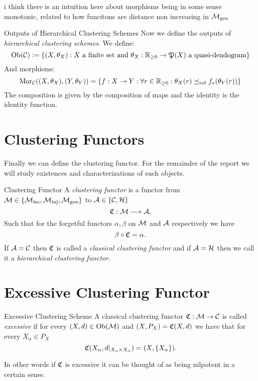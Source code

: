 \todo i think there is an intuition here about morphisms being in some sense monotonic, related to how funcitons are distance non increasing in ${\mathcal{M}_\mathrm{gen}}$

\begin{definition}{Outputs of Hierarchical Clustering Schemes}{}
Now we define the outputs of \emph{hierarchical clustering schemes}. We define:
\begin{equation*}
    \mathrm {Ob}(\mathcal{C}) := \{(X, \theta_X): X \text{ a finite set and } \theta_X: \mathbb R_{\geq0} \to \mathfrak{P}(X) \text{ a quasi-dendogram}\}
\end{equation*}
And morphisms:
\begin{equation*}
    \mathrm {Mor}_{\mathcal{C}}((X, \theta_X), (Y,\theta_Y)) = \{f: X \to Y: \forall r \in \mathbb R_{\geq0}: \theta_X(r) \preceq_\mathrm{ref} f_*(\theta_Y(r)) \}
\end{equation*}
The composition is given by the composition of maps and the identity is the identity function.
\end{definition}

\section{Clustering Functors}
Finally we can define the clustering functor. For the remainder of the report we will study existences and characterizations of such objects.
\begin{definition}{Clustering Functor}{}
A \emph{clustering functor} is a functor from $\mathcal{M} \in \{{\mathcal{M}_\mathrm{iso}}, {\mathcal{M}_\mathrm{inj}}, {\mathcal{M}_\mathrm{gen}}\}$ to $\mathcal{A} \in \{\mathcal{C}, \mathcal{H}\}$
$$\mathfrak{C} : \mathcal{M} \longrightarrow \mathcal{A}.$$
Such that for the forgetful functors $\alpha, \beta$ on $\mathcal{M}$ and $\mathcal{A}$ respectively we have
\begin{equation*}
    \beta \circ \mathfrak{C} = \alpha.
\end{equation*}
If $\mathcal{A} = \mathcal{C}$ then $\mathfrak{C}$ is called a \emph{classical clustering functor} and if $\mathcal{A} = \mathcal{H}$ then we call it a \emph{hierarchical clustering functor}.
\end{definition}



\section{Excessive Clustering Functor}
\begin{definition}{Excessive Clustering Scheme}{}
A classical clustering functor $\mathfrak{C}: \mathcal{M} \to \mathcal{C}$ is called \emph{excessive} if for every $(X,d) \in \mathrm {Ob}(\mathcal{M})$ and $(X,P_X) = \mathfrak{C}(X,d)$ we have that for every $X_\alpha \in P_X$
\begin{equation*}
    \mathfrak{C}(X_\alpha, d|_{X_\alpha \times X_\alpha}) = (X,\{X_\alpha\}).
\end{equation*}
\end{definition}
In other words if $\mathfrak{C}$ is excessive it can be thought of as being nilpotent in a certain sense.

